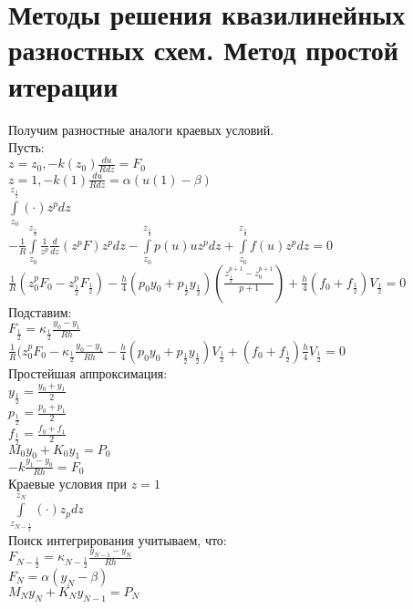 \section{Методы решения квазилинейных разностных схем. Метод простой итерации}
Получим разностные аналоги краевых условий.\\
Пусть:\\
$z = z_0, -k(z_0)\frac{du}{R dz} = F_0$\\
$z = 1, -k(1) \frac{du}{R dz} = \alpha(u(1) - \beta)$\\
$\int\limits_{z_0}^{z_{\frac{1}{2}}}(\cdot)z^p dz$\\
$-\frac{1}{R}\int\limits_{z_0}^{z_{\frac{1}{2}}}\frac{1}{z^p} \frac{d}{dz} (z^p F) z^p dz - \int\limits_{z_0}^{z_{\frac{1}{2}}} p(u) u z^p dz + \int\limits_{z_0}^{z_{\frac{1}{2}}} f(u) z^p dz = 0$\\
$\frac{1}{R} (z_0^p F_0 - z^p_{\frac{1}{2}} F_{\frac{1}{2}}) - \frac{h}{4}(p_0 y_0 + p_{\frac{1}{2}} y_{\frac{1}{2}})(\frac{z^{p+1}_{\frac{1}{2}} - z_0^{p+1}}{p+1}) + \frac{h}{4}(f_0 + f_{\frac{1}{2}})V_{\frac{1}{2}} = 0$\\

Подставим:\\
$F_{\frac{1}{2}} = \kappa_{\frac{1}{2}} \frac{y_0 - y_1}{Rh}$\\
$\frac{1}{R}(z_0^p F_0 - \kappa_{\frac{1}{2}}\frac{y_0 - y_1}{Rh} - \frac{h}{4}(p_0 y_0 + p_{\frac{1}{2}} y_{\frac{1}{2}}) V_{\frac{1}{2}} + (f_0 + f_{\frac{1}{2}})\frac{h}{4} V_{\frac{1}{2}} = 0$\\
Простейшая аппроксимация:\\

$y_\frac{1}{2} = \frac{y_0 + y_1}{2}$\\
$p_\frac{1}{2} = \frac{p_0 + p_1}{2}$\\
$f_\frac{1}{2} = \frac{f_0 + f_1}{2}$\\

$M_0 y_0 + K_0 y_1 = P_0$\\
$-k\frac{y_1 - y_0}{Rh} = F_0$\\

Краевые условия при $z = 1$\\
$\int\limits_{z_{N-\frac{1}{2}}}^{z_N} (\cdot) z_p dz$\\
Поиск интегрирования учитываем, что:\\
$F_{N-\frac{1}{2}} = \kappa_{N-\frac{1}{2}}\frac{y_{N-1} - y_N}{Rh}$\\
$F_N = \alpha(y_N - \beta)$\\
$M_N y_N + K_N y_{N-1} = P_N$\\

